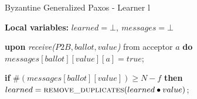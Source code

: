 \begin{algorithm}
	\caption{Byzantine Generalized Paxos - Learner l}
	\label{BFT-Learn}
	\textbf{Local variables:} $learned = \bot,\ messages = \bot$ 
	\begin{algorithmic}[1]
		\State \textbf{upon} \textit{receive($P2B, ballot, value$)} from acceptor $a$ \textbf{do}
		\State \hspace{\algorithmicindent} $messages[ballot][value][a] = true$;
		
		\State \hspace{\algorithmicindent} \textbf{if} $\#(messages[ballot][value]) \geq N-f$ \textbf{then}
		\State \hspace{\algorithmicindent}\hspace{\algorithmicindent}\hspace{\algorithmicindent}\hspace{\algorithmicindent}
		$learned = \Call{remove\_duplicates}{learned \bullet value}$;
	\end{algorithmic}
\end{algorithm}